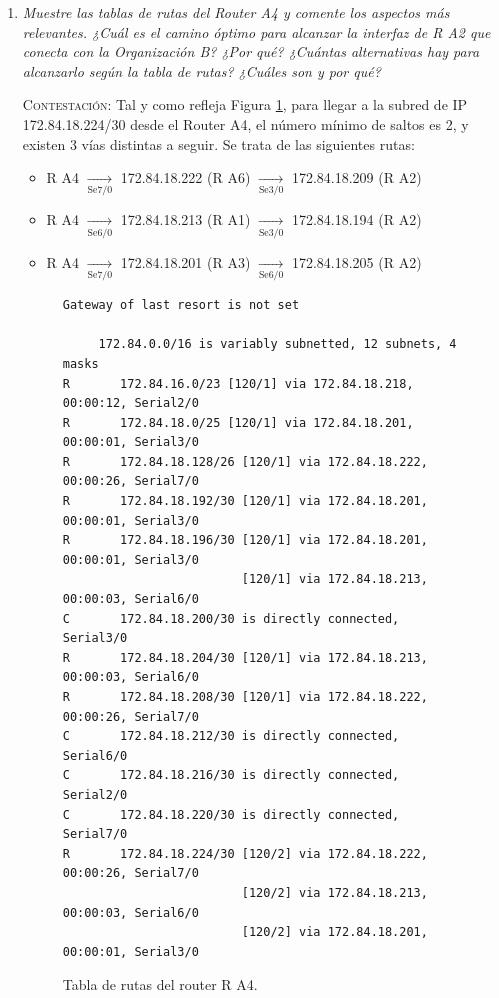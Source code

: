 \documentclass[11pt]{article}
\begin{document}
\begin{enumerate}
    \item \textit{Muestre las tablas de rutas del Router A4 y comente los aspectos más relevantes. ¿Cuál es el camino óptimo para alcanzar la interfaz de R A2 que conecta con
la Organización B? ¿Por qué? ¿Cuántas alternativas hay
para alcanzarlo según la tabla de rutas? ¿Cuáles son y por qué?}

\vspace{7px}

\textsc{Contestación}: Tal y como refleja Figura \ref{fig:2.1.1.1}, para llegar a la subred de IP 172.84.18.224/30 desde el Router A4, el número mínimo de saltos es 2, y existen 3 vías distintas a seguir. Se trata de las siguientes rutas:

\begin{itemize}
    \item R A4 $\xrightarrow[\text{Se7/0}]{}$ 172.84.18.222 (R A6) $\xrightarrow[\text{Se3/0}]{}$ 172.84.18.209 (R A2)

    \item R A4 $\xrightarrow[\text{Se6/0}]{}$ 172.84.18.213 (R A1) $\xrightarrow[\text{Se3/0}]{}$ 172.84.18.194 (R A2)

    \item R A4 $\xrightarrow[\text{Se7/0}]{}$ 172.84.18.201 (R A3) $\xrightarrow[\text{Se6/0}]{}$ 172.84.18.205 (R A2)
\end{itemize}

\begin{figure}[h]
\begin{verbatim}
Gateway of last resort is not set

     172.84.0.0/16 is variably subnetted, 12 subnets, 4 masks
R       172.84.16.0/23 [120/1] via 172.84.18.218, 00:00:12, Serial2/0
R       172.84.18.0/25 [120/1] via 172.84.18.201, 00:00:01, Serial3/0
R       172.84.18.128/26 [120/1] via 172.84.18.222, 00:00:26, Serial7/0
R       172.84.18.192/30 [120/1] via 172.84.18.201, 00:00:01, Serial3/0
R       172.84.18.196/30 [120/1] via 172.84.18.201, 00:00:01, Serial3/0
                         [120/1] via 172.84.18.213, 00:00:03, Serial6/0
C       172.84.18.200/30 is directly connected, Serial3/0
R       172.84.18.204/30 [120/1] via 172.84.18.213, 00:00:03, Serial6/0
R       172.84.18.208/30 [120/1] via 172.84.18.222, 00:00:26, Serial7/0
C       172.84.18.212/30 is directly connected, Serial6/0
C       172.84.18.216/30 is directly connected, Serial2/0
C       172.84.18.220/30 is directly connected, Serial7/0
R       172.84.18.224/30 [120/2] via 172.84.18.222, 00:00:26, Serial7/0
                         [120/2] via 172.84.18.213, 00:00:03, Serial6/0
                         [120/2] via 172.84.18.201, 00:00:01, Serial3/0
\end{verbatim}
\caption{Tabla de rutas del router R A4.}
\label{fig:2.1.1.1}
\end{figure}


\end{enumerate}
\end{document}
